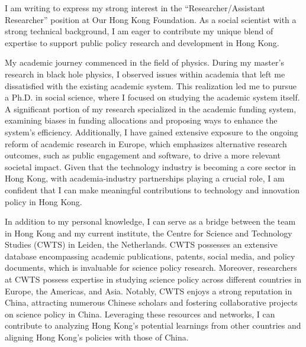 \documentclass[11pt, a4paper]{awesome-cv}
\begin{document}
\makecvheader[R]

\makecvfooter
  {}%
  {}%
  {}

\makelettertitle

\begin{cvletter}



I am writing to express my strong interest in the ``Researcher/Assistant Researcher'' position at Our Hong Kong Foundation. As a social scientist with a strong technical background, I am eager to contribute my unique blend of expertise to support public policy research and development in Hong Kong.

My academic journey commenced in the field of physics. During my master's research in black hole physics, I observed issues within academia that left me dissatisfied with the existing academic system. This realization led me to pursue a Ph.D. in social science, where I focused on studying the academic system itself. A significant portion of my research specialized in the academic funding system, examining biases in funding allocations and proposing ways to enhance the system's efficiency. Additionally, I have gained extensive exposure to the ongoing reform of academic research in Europe, which emphasizes alternative research outcomes, such as public engagement and software, to drive a more relevant societal impact. Given that the technology industry is becoming a core sector in Hong Kong, with academia-industry partnerships playing a crucial role, I am confident that I can make meaningful contributions to technology and innovation policy in Hong Kong.

In addition to my personal knowledge, I can serve as a bridge between the team in Hong Kong and my current institute, the Centre for Science and Technology Studies (CWTS) in Leiden, the Netherlands. CWTS possesses an extensive database encompassing academic publications, patents, social media, and policy documents, which is invaluable for science policy research. Moreover, researchers at CWTS possess expertise in studying science policy across different countries in Europe, the Americas, and Asia. Notably, CWTS enjoys a strong reputation in China, attracting numerous Chinese scholars and fostering collaborative projects on science policy in China. Leveraging these resources and networks, I can contribute to analyzing Hong Kong's potential learnings from other countries and aligning Hong Kong's policies with those of China.


\end{cvletter}
\end{document}
